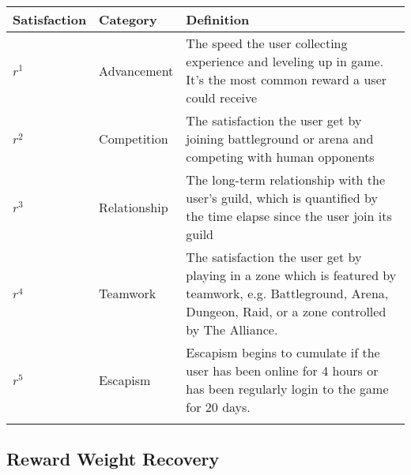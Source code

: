 \documentclass[a4paper]{article}
\begin{document}
\begin{tabular}{l|l|p{7cm}}
    \toprule
    Satisfaction & Category & Definition \\
    \midrule
    $r^1$ & Advancement & The speed the user collecting experience and leveling up in game. It's the most common reward a user could receive \\
    $r^2$ & Competition & The satisfaction the user get by joining battleground or arena and competing with human opponents \\
    $r^3$ & Relationship & The long-term relationship with the user's guild, which is quantified by the time elapse since the user join its guild \\
    $r^4$ & Teamwork & The satisfaction the user get by playing in a zone which is featured by teamwork, e.g. Battleground, Arena, Dungeon, Raid, or a zone controlled by The Alliance. \\
    $r^5$ & Escapism & Escapism begins to cumulate if the user has been online for 4 hours or has been regularly login to the game for 20 days. \\
    \bottomrule
    \label{tbl:rewards}
\end{tabular}

\subsection{Reward Weight Recovery}
\end{document}
